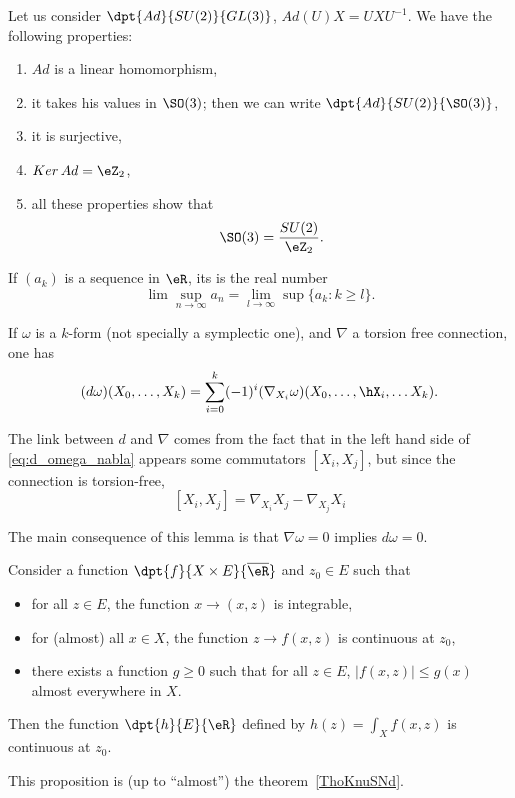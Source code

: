 \begin{theorem} \label{1503t1}
	Let us consider $\dpt{Ad}{SU(2)}{GL(3)}$, $Ad(U)X=UXU^{-1}$. We have the following properties:

	\begin{enumerate}
		\item $Ad$ is a linear homomorphism,
		\item it takes his values in $\SO(3)$; then we can write $\dpt{Ad}{SU(2)}{\SO(3)}$,
		\item it is surjective,
		\item $Ker\,Ad=\eZ_2$,
		\item all these properties show that \[\SO(3)=\frac{SU(2)}{\eZ_2}.\]
	\end{enumerate}
\end{theorem}

\begin{definition}
	If $(a_k)$ is a sequence in $\eR$, its  is the real number
	\[
		\lim\sup_{n\to\infty}a_n=\lim_{l\to\infty}\sup\{a_k:k\geq l\}.
	\]
\end{definition}

\begin{lemma}
	If $\omega$ is a $k$-form (not specially a symplectic one), and $\nabla$ a torsion free connection, one has
	\begin{equation}\label{eq:d_omega_nabla}
		(d\omega)(X_0,\ldots,X_k)=\sum_{i=0}^k (-1)^i(\nabla_{X_i}\omega)(X_0,\ldots,\hX_i,\ldots X_k).
	\end{equation}
\end{lemma}

\begin{remark}
	The link between $d$ and $\nabla$ comes from the fact that in the left hand side of \eqref{eq:d_omega_nabla} appears some commutators $[X_i,X_j]$, but since the connection is torsion-free,
	\[
		[X_i,X_j]=\nabla_{X_i}X_j-\nabla_{X_j}X_i
	\]
\end{remark}
The main consequence of this lemma is that $\nabla\omega=0$ implies $d\omega=0$.

\begin{proposition} \label{prop:fdefint}
	Consider a function $\dpt{f}{X\times E}{\overline{\eR}}$ and $z_0\in E$ such that
	\begin{itemize}
		\item for all $z\in E$, the function $x\to(x,z)$ is integrable,
		\item for (almost) all $x\in X$, the function $z\to f(x,z)$ is continuous at $z_0$,
		\item there exists a function $g\geq 0$ such that for all $z\in E$, $| f(x,z) |\leq g(x)$ almost everywhere in $X$.
	\end{itemize}
	Then the function $\dpt{h}{E}{\eR}$ defined by $h(z)=\int_Xf(x,z)$ is continuous at $z_0$.
\end{proposition}
This proposition is (up to ``almost'') the theorem~\ref{ThoKnuSNd}.

